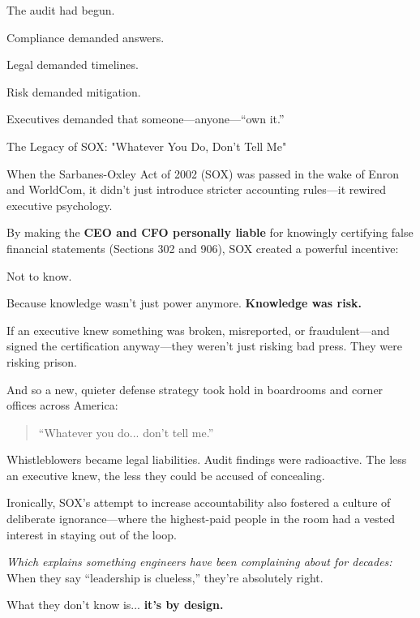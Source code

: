     The audit had begun.
    
    Compliance demanded answers.
    
    Legal demanded timelines.
    
    Risk demanded mitigation.
    
    Executives demanded that someone—anyone—“own it.”

    \medskip

\begin{HistoricalSidebar}{The Legacy of SOX: "Whatever You Do, Don't Tell Me"}

    When the Sarbanes-Oxley Act of 2002 (SOX) was passed in the wake of Enron and WorldCom, it didn’t just introduce stricter accounting rules—it rewired executive psychology.

    \medskip
    
    By making the \textbf{CEO and CFO personally liable} for knowingly certifying false financial statements (Sections 302 and 906), SOX created a powerful incentive:

    \medskip
    
    Not to know.

    \medskip
    
    Because knowledge wasn’t just power anymore.  
    \textbf{Knowledge was risk.}

    \medskip
    
    If an executive knew something was broken, misreported, or fraudulent—and signed the certification anyway—they weren’t just risking bad press.  
    They were risking prison.

    \medskip
    
    And so a new, quieter defense strategy took hold in boardrooms and corner offices across America:
    
    \begin{quote}
    “Whatever you do... don’t tell me.”
    \end{quote}
    
    Whistleblowers became legal liabilities.  
    Audit findings were radioactive.  
    The less an executive knew, the less they could be accused of concealing.

    \medskip
    
    Ironically, SOX’s attempt to increase accountability also fostered a culture of deliberate ignorance—where the highest-paid people in the room had a vested interest in staying out of the loop.
    
    \medskip
    
    \textit{Which explains something engineers have been complaining about for decades:} 
    When they say “leadership is clueless,” they’re absolutely right.

    \medskip
    
    What they don’t know is...  \textbf{it’s by design.}
    
\end{HistoricalSidebar}

